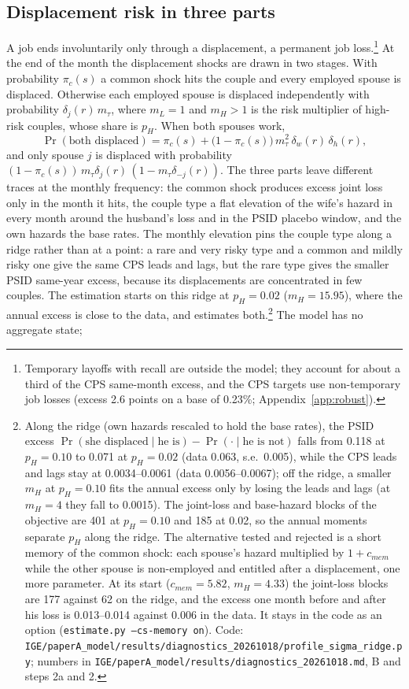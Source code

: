 \subsection{Displacement risk in three parts}

A job ends involuntarily only through a displacement, a permanent job loss.\footnote{Temporary layoffs with recall are
outside the model; they account for about a third of the CPS same-month excess, and the CPS targets use non-temporary
job losses (excess 2.6 points on a base of 0.23\%; Appendix~\ref{app:robust}).} At the end of the month the
displacement shocks are drawn in two stages. With probability $\pi_c(s)$ a common shock hits the couple and every
employed spouse is displaced. Otherwise each employed spouse is displaced independently with probability
$\delta_j(r)\, m_\tau$, where $m_L = 1$ and $m_H > 1$ is the risk multiplier of high-risk couples, whose share is
$p_H$. When both spouses work,
\begin{equation}\label{eq:both}
  \Pr(\text{both displaced}) = \pi_c(s) + \big(1 - \pi_c(s)\big)\, m_\tau^2\, \delta_w(r)\,\delta_h(r),
\end{equation}
and only spouse $j$ is displaced with probability $(1 - \pi_c(s))\, m_\tau \delta_j(r)\,(1 - m_\tau \delta_{-j}(r))$.
The three parts leave different traces at the monthly frequency: the common shock produces excess joint loss only in
the month it hits, the couple type a flat elevation of the wife's hazard in every month around the husband's loss and
in the PSID placebo window, and the own hazards the base rates. The monthly elevation pins the couple type along a
ridge rather than at a point: a rare and very risky type and a common and mildly risky one give the same CPS leads and
lags, but the rare type gives the smaller PSID same-year excess, because its displacements are concentrated in few
couples. The estimation starts on this ridge at $p_H = 0.02$ ($m_H = 15.95$), where the annual excess is close to the
data, and estimates both.\footnote{Along the ridge (own hazards rescaled to hold the base rates), the PSID excess
$\Pr(\text{she displaced} \mid \text{he is}) - \Pr(\cdot \mid \text{he is not})$ falls from 0.118 at $p_H = 0.10$ to
0.071 at $p_H = 0.02$ (data 0.063, s.e.\ 0.005), while the CPS leads and lags stay at 0.0034--0.0061 (data
0.0056--0.0067); off the ridge, a smaller $m_H$ at $p_H = 0.10$ fits the annual excess only by losing the leads and lags
(at $m_H = 4$ they fall to 0.0015). The joint-loss and base-hazard blocks of the objective are 401 at $p_H = 0.10$ and
185 at 0.02, so the annual moments separate $p_H$ along the ridge. The alternative tested and rejected is a short memory
of the common shock: each spouse's hazard multiplied by $1 + c_{mem}$ while the other spouse is non-employed and
entitled after a displacement, one more parameter. At its start ($c_{mem} = 5.82$, $m_H = 4.33$) the joint-loss blocks
are 177 against 62 on the ridge, and the excess one month before and after his loss is 0.013--0.014 against 0.006 in
the data. It stays in the code as an option (\texttt{estimate.py --cs-memory on}). Code:
\texttt{IGE/paperA\_model/results/diagnostics\_20261018/profile\_sigma\_ridge.py}; numbers in
\texttt{IGE/paperA\_model/results/diagnostics\_20261018.md}, B and steps 2a and 2.} The model has no aggregate state;
